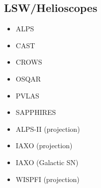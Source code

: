 \documentclass[8pt,twocolumn]{extarticle}
\begin{document}
\begin{mdframed}[everyline=true]
\begin{itemize}
\end{itemize}
\vspace{-2.5em}
\subsection*{LSW/Helioscopes}\vspace{-0.5em}
\begin{itemize}\setlength\itemsep{-0.5em}
    \item ALPS~\cite{Ehret:2010mh}
    \item CAST~\cite{CAST:2007jps,CAST:2017uph}
    \item CROWS~\cite{Betz:2013dza}
    \item OSQAR~\cite{OSQAR:2015qdv}
    \item PVLAS~\cite{DellaValle:2015xxa}
    \item SAPPHIRES~\cite{SAPPHIRES:2021vkz,SAPPHIRES:2022bqg}
    \item ALPS-II (projection)~\cite{Ortiz:2020tgs}
    \item IAXO (projection)~\cite{IAXO:2019mpb}
    \item IAXO (Galactic SN)~\cite{Ge:2020zww}
    \item WISPFI (projection)~\cite{Batllori:2023pap}

\end{itemize}



\end{mdframed}
\end{document}
